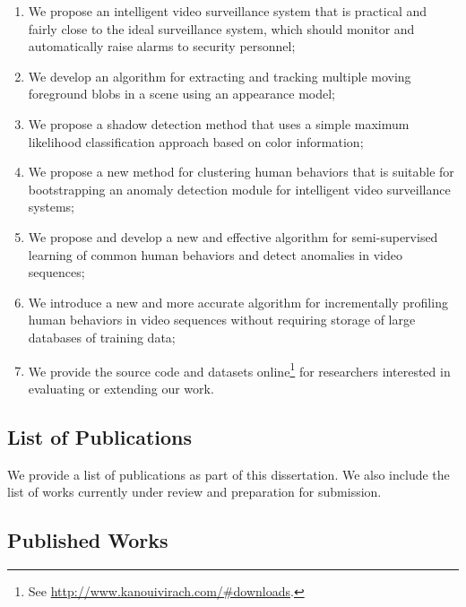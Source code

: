 \begin{enumerate}
  \item We propose an intelligent video surveillance system that is
    practical and fairly close to the ideal surveillance system, which
    should monitor and automatically raise alarms to security
    personnel;

  \item We develop an algorithm for extracting and tracking multiple 
    moving foreground blobs in a scene using an appearance model;

  \item We propose a shadow detection method that uses a simple
    maximum likelihood classification approach based on color
    information;

  \item We propose a new method for clustering human behaviors that 
    is suitable for bootstrapping an anomaly detection module for 
    intelligent video surveillance systems;

  \item We propose and develop a new and effective algorithm for
    semi-supervised learning of common human behaviors and detect 
    anomalies in video sequences;

  \item We introduce a new and more accurate algorithm for
    incrementally profiling human behaviors in video sequences without
    requiring storage of large databases of training data;

  \item We provide the source code and datasets
    online\footnote{See \url{http://www.kanouivirach.com/#downloads}.}
    for researchers interested in evaluating or extending our work.
\end{enumerate}

\subsection{List of Publications}

We provide a list of publications as part of this dissertation. We
also include the list of works currently under review and preparation
for submission.

\subsection*{Published Works}

